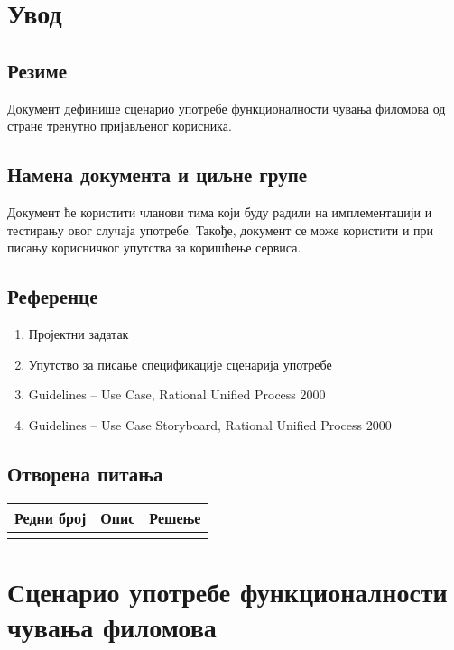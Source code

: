\section{Увод}

\subsection{Резиме}

Документ дефинише сценарио употребе функционалности чувања филомова од стране тренутно пријављеног
корисника.

\subsection{Намена документа и циљне групе}

Документ ће користити чланови тима који буду радили на имплементацији и тестирању овог случаја
употребе. Такође, документ се може користити и при писању корисничког упутства за коришћење
сервиса.

\subsection{Референце}

\begin{enumerate}
    \item Пројектни задатак
    \item Упутство за писање спецификације сценарија употребе
    \item Guidelines – Use Case, Rational Unified Process 2000
    \item Guidelines – Use Case Storyboard, Rational Unified Process 2000
\end{enumerate}

\subsection{Отворена питања}

\noindent
\setcellgapes{4pt}
\makegapedcells
\begin{tabularx}{\linewidth}{|l|X|X|}
    \hline
    \textbf{Редни број} & \textbf{Опис} & \textbf{Решење} \\
    \hline
    & & \\
    \hline
\end{tabularx}

\section{Сценарио употребе функционалности чувања филомова}

